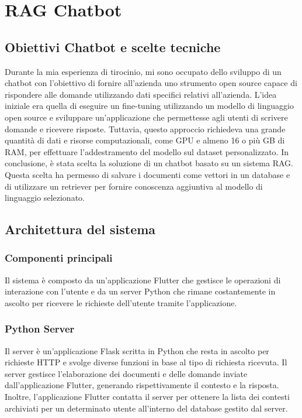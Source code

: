 \chapter{RAG Chatbot}

\section{Obiettivi Chatbot e scelte tecniche}
Durante la mia esperienza di tirocinio, mi sono occupato dello sviluppo di un chatbot con l'obiettivo di fornire all'azienda uno strumento open source capace di rispondere alle domande utilizzando dati specifici relativi all'azienda.
L'idea iniziale era quella di eseguire un fine-tuning utilizzando un modello di linguaggio open source e sviluppare un'applicazione che permettesse agli utenti di scrivere domande e ricevere risposte. Tuttavia, questo approccio richiedeva una grande quantità di dati e risorse computazionali, come GPU e almeno 16 o più GB di RAM, per effettuare l'addestramento del modello sul dataset personalizzato.
In conclusione, è stata scelta la soluzione di un chatbot basato su un sistema RAG. Questa scelta ha permesso di salvare i documenti come vettori in un database e di utilizzare un retriever per fornire conoscenza aggiuntiva al modello di linguaggio selezionato.

\section{Architettura del sistema}

\subsection{Componenti principali}
Il sistema è composto da un'applicazione Flutter che gestisce le operazioni di interazione con l'utente e da un server Python che rimane costantemente in ascolto per ricevere le richieste dell'utente tramite l'applicazione.

\subsection{Python Server}
Il server è un'applicazione Flask scritta in Python che resta in ascolto per richieste HTTP e svolge diverse funzioni in base al tipo di richiesta ricevuta. Il server gestisce l'elaborazione dei documenti e delle domande inviate dall'applicazione Flutter, generando rispettivamente il contesto e la risposta. Inoltre, l'applicazione Flutter contatta il server per ottenere la lista dei contesti archiviati per un determinato utente all'interno del database gestito dal server.

